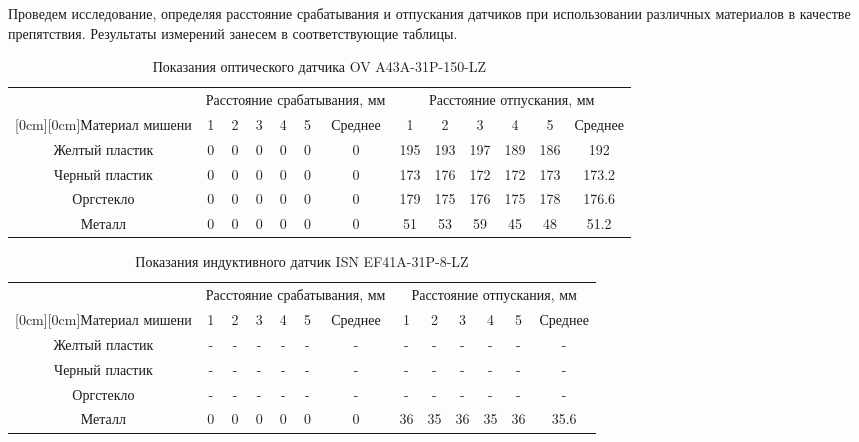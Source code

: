 Проведем исследование, определяя расстояние срабатывания и отпускания датчиков при использовании различных материалов в качестве препятствия.
Результаты измерений занесем в соответствующие таблицы.
\begin{table}[!h]
    \centering
    \caption{Показания оптического датчика OV A43A-31P-150-LZ}
    \label{tab:1}
    \begin{tabular}{|c|c|c|c|c|c|c|c|c|c|c|c|c|}
        \hline
        & \multicolumn{6}{c|}{Расстояние срабатывания, мм} & \multicolumn{6}{c|}{Расстояние отпускания, мм}\\
        \cline{2-13}
        \raisebox{1.5ex}[0cm][0cm]{Материал мишени}
        & 1 & 2&3 &4 &5 & Среднее &1 &2 &3 &4 &5 &Среднее \\
        \hline
        Желтый пластик & 0 & 0 & 0 & 0 & 0 & 0 & 195 & 193 & 197 & 189 &186 & 192\\
        Черный пластик & 0 & 0 & 0 & 0 & 0 & 0 & 173 & 176 & 172 & 172 &173 & 173.2\\
        Оргстекло & 0 & 0 & 0 & 0 & 0 & 0 & 179 & 175 & 176 & 175 &178 &176.6\\
        Металл & 0 & 0 & 0 & 0 & 0 & 0 & 51 & 53 & 59 & 45 &48 & 51.2\\
        \hline
    \end{tabular}
\end{table}
\begin{table}[!h]
    \centering
    \caption{Показания индуктивного датчик ISN EF41A-31P-8-LZ}
    \label{tab:2}
    \begin{tabular}{|c|c|c|c|c|c|c|c|c|c|c|c|c|}
        \hline
        & \multicolumn{6}{c|}{Расстояние срабатывания, мм} & \multicolumn{6}{c|}{Расстояние отпускания, мм}\\
        \cline{2-13}
        \raisebox{1.5ex}[0cm][0cm]{Материал мишени}
        & 1 & 2&3 &4 &5 & Среднее &1 &2 &3 &4 &5 &Среднее \\
        \hline
        Желтый пластик & -& -& -& -& -& -& -& -& -& -& -& -\\
        Черный пластик& -& -& -& -& -& -& -& -& -& -& -& -\\
        Оргстекло & -& -& -& -& -& -& -& -& -& -& -& -\\
        Металл & 0 & 0 & 0 & 0 & 0 & 0 & 36 & 35 & 36 & 35 &36 & 35.6\\
        \hline
    \end{tabular}
\end{table}

